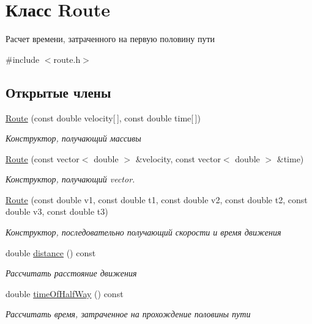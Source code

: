 \hypertarget{classRoute}{}\section{Класс Route}
\label{classRoute}


Расчет времени, затраченного на первую половину пути  




{\ttfamily \#include $<$route.\+h$>$}

\subsection*{Открытые члены}
\begin{DoxyCompactItemize}
\item 
\hyperlink{classRoute_adbe31517764e0b91c1d5d9935021f3d2}{Route} (const double velocity\mbox{[}$\,$\mbox{]}, const double time\mbox{[}$\,$\mbox{]})
\begin{DoxyCompactList}\small\item\em Конструктор, получающий массивы \end{DoxyCompactList}\item 
\hyperlink{classRoute_a515807cf7ed5d70f96c7845db65a6a65}{Route} (const vector$<$ double $>$ \&velocity, const vector$<$ double $>$ \&time)
\begin{DoxyCompactList}\small\item\em Конструктор, получающий vector. \end{DoxyCompactList}\item 
\hyperlink{classRoute_a944926e79675629ee5f1be028d3d25ec}{Route} (const double v1, const double t1, const double v2, const double t2, const double v3, const double t3)
\begin{DoxyCompactList}\small\item\em Конструктор, последовательно получающий скорости и время движения \end{DoxyCompactList}\item 
double \hyperlink{classRoute_a01f944ed6f4d03165bcf48dc3cd36e77}{distance} () const 
\begin{DoxyCompactList}\small\item\em Рассчитать расстояние движения \end{DoxyCompactList}\item 
double \hyperlink{classRoute_a5dcc19794f0edaa06fb89a0a3d60ff70}{time\+Of\+Half\+Way} () const 
\begin{DoxyCompactList}\small\item\em Рассчитать время, затраченное на прохождение половины пути \end{DoxyCompactList}\end{DoxyCompactItemize}


